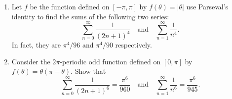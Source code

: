 \documentclass[12 pt, letterpaper]{hmcpset}
\begin{document}
\pagebreak

\begin{problem}[S \& S \S 3.3 \#8]
	\begin{enumerate}
		\item Let $f$ be the function defined on $[-\pi, \pi]$ by $f(\theta) = \lvert \theta \rvert$ use Parseval's identity to find the sums of the following two series:
			\[
				\sum_{n = 0}^{\infty} \frac{1}{(2n + 1)^{4}} \quad \text{and} \quad \sum_{n = 1}^{\infty} \frac{1}{n^{4}}.
			\]
			In fact, they are $\pi^{4} / 96$ and $\pi^{4} / 90$ respectively.
		\item Consider the $2 \pi$-periodic odd function defined on $[0, \pi]$ by $f(\theta) = \theta (\pi - \theta)$. Show that
			\[
				\sum_{n = 0}^{\infty} \frac{1}{(2n + 1)^{6}} = \frac{\pi^{6}}{960} \quad \text{and} \quad \sum_{n = 1}^{\infty} \frac{1}{n^{6}} = \frac{\pi^{6}}{945}.
			\]
	\end{enumerate}
\end{problem}
\end{document}
